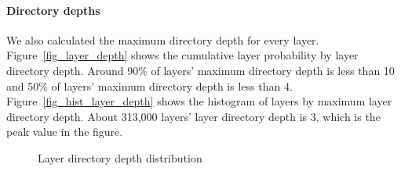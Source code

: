 
\paragraph{Directory depths}

We also calculated the maximum directory depth for every layer.
%
Figure~\ref{fig_layer_depth} shows the cumulative layer probability by layer
directory depth.
%
Around 90\% of layers' maximum directory depth is less than 10
and 50\% of layers'  maximum directory depth is less than 4. 
%
Figure~\ref{fig_hist_layer_depth} shows the histogram of layers by
maximum layer directory depth.
%
About 313,000 layers' layer directory depth is 3, which is the peak value in
the figure.
%

\begin{figure}[!t]
	\centering
	\caption{Layer directory depth distribution}
	\label{fig-layer-dir}
\end{figure}
